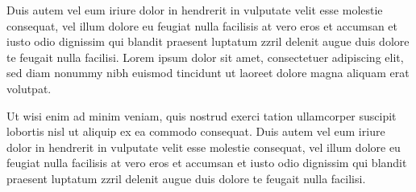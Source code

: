\documentclass[a4paper,
  ]{scrartcl}
\begin{document}
Duis autem vel eum iriure dolor in hendrerit in vulputate velit esse molestie consequat, vel illum dolore eu feugiat nulla facilisis at vero eros et accumsan et iusto odio dignissim qui blandit praesent luptatum zzril delenit augue duis dolore te feugait nulla facilisi. Lorem ipsum dolor sit amet, consectetuer adipiscing elit, sed diam nonummy nibh euismod tincidunt ut laoreet dolore magna aliquam erat volutpat.

Ut wisi enim ad minim veniam, quis nostrud exerci tation ullamcorper suscipit lobortis nisl ut aliquip ex ea commodo consequat. Duis autem vel eum iriure dolor in hendrerit in vulputate velit esse molestie consequat, vel illum dolore eu feugiat nulla facilisis at vero eros et accumsan et iusto odio dignissim qui blandit praesent luptatum zzril delenit augue duis dolore te feugait nulla facilisi.
\end{document}
